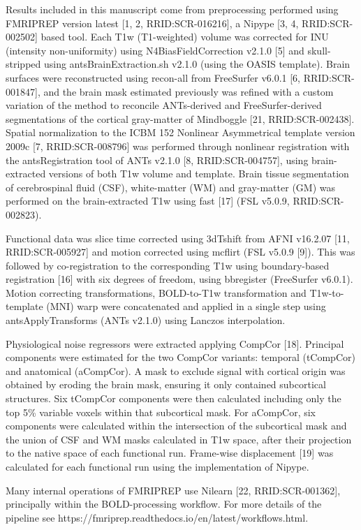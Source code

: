 Results included in this manuscript come from preprocessing performed using FMRIPREP version latest [1, 2, RRID:SCR-016216], a Nipype [3, 4, RRID:SCR-002502] based tool. Each T1w (T1-weighted) volume was corrected for INU (intensity non-uniformity) using N4BiasFieldCorrection v2.1.0 [5] and skull-stripped using antsBrainExtraction.sh v2.1.0 (using the OASIS template). Brain surfaces were reconstructed using recon-all from FreeSurfer v6.0.1 [6, RRID:SCR-001847], and the brain mask estimated previously was refined with a custom variation of the method to reconcile ANTs-derived and FreeSurfer-derived segmentations of the cortical gray-matter of Mindboggle [21, RRID:SCR-002438]. Spatial normalization to the ICBM 152 Nonlinear Asymmetrical template version 2009c [7, RRID:SCR-008796] was performed through nonlinear registration with the antsRegistration tool of ANTs v2.1.0 [8, RRID:SCR-004757], using brain-extracted versions of both T1w volume and template. Brain tissue segmentation of cerebrospinal fluid (CSF), white-matter (WM) and gray-matter (GM) was performed on the brain-extracted T1w using fast [17] (FSL v5.0.9, RRID:SCR-002823).

Functional data was slice time corrected using 3dTshift from AFNI v16.2.07 [11, RRID:SCR-005927] and motion corrected using mcflirt (FSL v5.0.9 [9]). This was followed by co-registration to the corresponding T1w using boundary-based registration [16] with six degrees of freedom, using bbregister (FreeSurfer v6.0.1). Motion correcting transformations, BOLD-to-T1w transformation and T1w-to-template (MNI) warp were concatenated and applied in a single step using antsApplyTransforms (ANTs v2.1.0) using Lanczos interpolation.

Physiological noise regressors were extracted applying CompCor [18]. Principal components were estimated for the two CompCor variants: temporal (tCompCor) and anatomical (aCompCor). A mask to exclude signal with cortical origin was obtained by eroding the brain mask, ensuring it only contained subcortical structures. Six tCompCor components were then calculated including only the top 5\% variable voxels within that subcortical mask. For aCompCor, six components were calculated within the intersection of the subcortical mask and the union of CSF and WM masks calculated in T1w space, after their projection to the native space of each functional run. Frame-wise displacement [19] was calculated for each functional run using the implementation of Nipype.

Many internal operations of FMRIPREP use Nilearn [22, RRID:SCR-001362], principally within the BOLD-processing workflow. For more details of the pipeline see https://fmriprep.readthedocs.io/en/latest/workflows.html.

